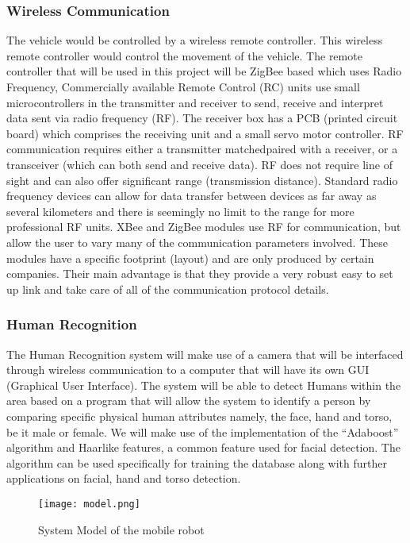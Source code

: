 \subsubsection{Wireless Communication}
The vehicle would be controlled by a wireless remote controller. This wireless remote controller would control the movement of the vehicle. The remote controller that will be used in this project will be ZigBee based which uses Radio Frequency, Commercially available Remote Control (R\/C) units use small microcontrollers in the transmitter and receiver to send, receive and interpret data sent via radio frequency (RF). The receiver box has a PCB (printed circuit board) which comprises the receiving unit and a small servo motor controller. RF communication requires either a transmitter matched\/paired with a receiver, or a transceiver (which can both send and receive data). RF does not require line of sight and can also offer significant range (transmission distance). Standard radio frequency devices can allow for data transfer between devices as far away as several kilometers and there is seemingly no limit to the range for more professional RF units.
XBee and ZigBee modules use RF for communication, but allow the user to vary many of the communication parameters involved. These modules have a specific footprint (layout) and are only produced by certain companies. Their main advantage is that they provide a very robust easy to set up link and take care of all of the communication protocol details.
\subsubsection{Human Recognition}
The Human Recognition system will make use of a camera that will be interfaced through wireless communication to a computer that will have its own GUI (Graphical User Interface). The system will be able to detect Humans within the area based on a program that will allow the system to identify a person by comparing specific physical human attributes namely, the face, hand and torso, be it male or female.
We will make use of the implementation of the “Adaboost” algorithm and Haar\-like features, a common feature used for facial detection. The algorithm can be used specifically for training the database along with further applications on facial, hand and torso detection. 

\begin{figure}[h]
	\centering
		\texttt{[image: model.png]}
	\caption{System Model of the mobile robot}
	\label{fig:model}
\end{figure}

